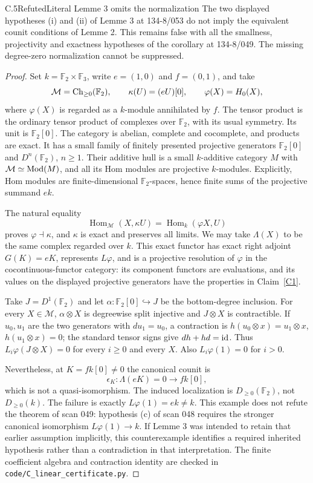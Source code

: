 \begin{claim}{C.5}{Refuted}{Literal Lemme 3 omits the normalization}\label{C5}
The two displayed hypotheses (i) and (ii) of Lemme 3 at 134-8/053 do not imply the equivalent counit conditions of Lemme 2. This remains false with all the smallness, projectivity and exactness hypotheses of the corollary at 134-8/049. The missing degree-zero normalization cannot be suppressed.
\end{claim}
\begin{proof}
Set $k=\mathbb F_2\times\mathbb F_3$, write $e=(1,0)$ and $f=(0,1)$, and take
\[
 \mathcal M=\operatorname{Ch}_{\geq0}(\mathbb F_2),\qquad
 \kappa(U)=(eU)[0],\qquad \varphi(X)=H_0(X),
\]
where $\varphi(X)$ is regarded as a $k$-module annihilated by $f$. The tensor product is the ordinary tensor product of complexes over $\mathbb F_2$, with its usual symmetry. Its unit is $\mathbb F_2[0]$. The category is abelian, complete and cocomplete, and products are exact. It has a small family of finitely presented projective generators $\mathbb F_2[0]$ and $D^n(\mathbb F_2)$, $n\geq1$. Their additive hull is a small $k$-additive category $M$ with $\mathcal M\simeq\operatorname{Mod}(M)$, and all its Hom modules are projective $k$-modules. Explicitly, Hom modules are finite-dimensional $\mathbb F_2$-spaces, hence finite sums of the projective summand $ek$.

The natural equality
\[
 \operatorname{Hom}_{\mathcal M}(X,\kappa U)
 =\operatorname{Hom}_k(\varphi X,U)
\]
proves $\varphi\dashv\kappa$, and $\kappa$ is exact and preserves all limits. We may take $\Lambda(X)$ to be the same complex regarded over $k$. This exact functor has exact right adjoint $G(K)=eK$, represents $L\varphi$, and is a projective resolution of $\varphi$ in the cocontinuous-functor category: its component functors are evaluations, and its values on the displayed projective generators have the properties in Claim~\ref{C1}.

Take $J=D^1(\mathbb F_2)$ and let $\alpha:\mathbb F_2[0]\hookrightarrow J$ be the bottom-degree inclusion. For every $X\in\mathcal M$, $\alpha\otimes X$ is degreewise split injective and $J\otimes X$ is contractible. If $u_0,u_1$ are the two generators with $du_1=u_0$, a contraction is $h(u_0\otimes x)=u_1\otimes x$, $h(u_1\otimes x)=0$; the standard tensor signs give $dh+hd=\operatorname{id}$. Thus $L_i\varphi(J\otimes X)=0$ for every $i\geq0$ and every $X$. Also $L_i\varphi(1)=0$ for $i>0$.

Nevertheless, at $K=fk[0]\ne0$ the canonical counit is
\[
 \epsilon_K:\Lambda(eK)=0\longrightarrow fk[0],
\]
which is not a quasi-isomorphism. The induced localization is $D_{\geq0}(\mathbb F_2)$, not $D_{\geq0}(k)$. The failure is exactly $L\varphi(1)=ek\ne k$. This example does not refute the theorem of scan 049: hypothesis (c) of scan 048 requires the stronger canonical isomorphism $L\varphi(1)\to k$. If Lemme 3 was intended to retain that earlier assumption implicitly, this counterexample identifies a required inherited hypothesis rather than a contradiction in that interpretation. The finite coefficient algebra and contraction identity are checked in \texttt{code/C\_linear\_certificate.py}.
\end{proof}

